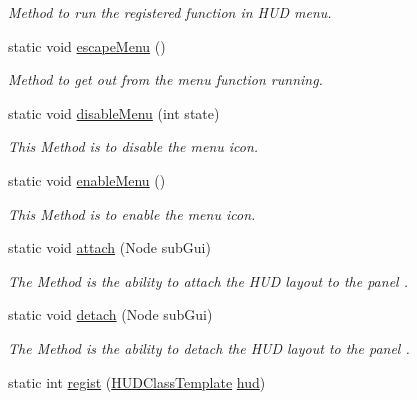 \begin{DoxyCompactItemize}
\begin{DoxyCompactList}\small\item\em Method to run the registered function in H\+U\+D menu. \end{DoxyCompactList}\item 
static void \hyperlink{classkr_1_1ac_1_1kookmin_1_1cs_1_1hud_1_1_h_u_d_management_af46086e2dbfc7fe58b45bc5d98fe08d8}{escape\+Menu} ()
\begin{DoxyCompactList}\small\item\em Method to get out from the menu function running. \end{DoxyCompactList}\item 
static void \hyperlink{classkr_1_1ac_1_1kookmin_1_1cs_1_1hud_1_1_h_u_d_management_a88d77a9d61e931e5b8460e7bfaa9558f}{disable\+Menu} (int state)
\begin{DoxyCompactList}\small\item\em This Method is to disable the menu icon. \end{DoxyCompactList}\item 
static void \hyperlink{classkr_1_1ac_1_1kookmin_1_1cs_1_1hud_1_1_h_u_d_management_a2d3e988e5636714778382ba504e00c6e}{enable\+Menu} ()
\begin{DoxyCompactList}\small\item\em This Method is to enable the menu icon. \end{DoxyCompactList}\item 
static void \hyperlink{classkr_1_1ac_1_1kookmin_1_1cs_1_1hud_1_1_h_u_d_management_a57652e0e587a00547e4664e13e87453d}{attach} (Node sub\+Gui)
\begin{DoxyCompactList}\small\item\em The Method is the ability to attach the H\+U\+D layout to the panel . \end{DoxyCompactList}\item 
static void \hyperlink{classkr_1_1ac_1_1kookmin_1_1cs_1_1hud_1_1_h_u_d_management_aa447140a88b6a509cf0c88518972ceb6}{detach} (Node sub\+Gui)
\begin{DoxyCompactList}\small\item\em The Method is the ability to detach the H\+U\+D layout to the panel . \end{DoxyCompactList}\item 
static int \hyperlink{classkr_1_1ac_1_1kookmin_1_1cs_1_1hud_1_1_h_u_d_management_a7b83ede582afefb75bfe90ed3c8fd688}{regist} (\hyperlink{classkr_1_1ac_1_1kookmin_1_1cs_1_1hud_1_1_h_u_d_class_template}{H\+U\+D\+Class\+Template} \hyperlink{classkr_1_1ac_1_1kookmin_1_1cs_1_1hud_1_1_h_u_d_management_a4c4a440b9bdbbe24eb50ee79826aee53}{hud})

\end{DoxyCompactItemize}
